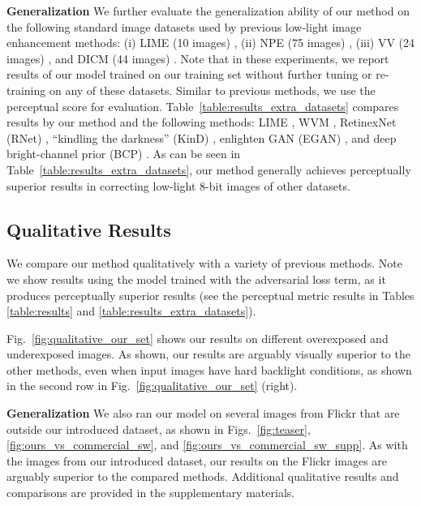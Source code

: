 \documentclass[final]{cvpr}
\begin{document}
\noindent\textbf{Generalization} We further evaluate the generalization ability of our method on the following standard image datasets used by previous low-light image enhancement methods: (i)  LIME (10 images) \cite{guo2017lime}, (ii)  NPE (75 images) \cite{wang2013naturalness}, (iii)  VV (24 images) \cite{VVDataset}, and  DICM (44 images) \cite{lee2012contrast}. Note that in these experiments, we report results of our model trained on our training set without further tuning or re-training on any of these datasets. Similar to previous methods, we use the  perceptual score \cite{mittal2012making} for evaluation. Table\ \ref{table:results_extra_datasets} compares results by our method and the following methods: LIME \cite{guo2016lime, guo2017lime}, WVM \cite{fu2016weighted}, RetinexNet (RNet) \cite{Chen2018Retinex}, ``kindling the darkness'' (KinD) \cite{zhang2019kindling}, enlighten GAN (EGAN) \cite{jiang2019enlightengan}, and deep bright-channel prior (BCP) \cite{8955834}. As can be seen in Table\ \ref{table:results_extra_datasets}, our method generally achieves perceptually superior results in correcting low-light 8-bit images of other datasets.













\subsection{Qualitative Results}\label{subsec:qual-results}

We compare our method qualitatively with a variety of previous methods. Note we show results using the model trained with the adversarial loss term, as it produces perceptually superior results (see the perceptual metric results in Tables \ref{table:results} and \ref{table:results_extra_datasets}).


Fig.~\ref{fig:qualitative_our_set} shows our results on different overexposed and underexposed images. As shown, our results are arguably visually superior to the other methods, even when input images have hard backlight conditions, as shown in the second row in Fig.~\ref{fig:qualitative_our_set} (right).

\noindent\textbf{Generalization} We also ran our model on several images from Flickr that are outside our introduced dataset, as shown in Figs.\ \ref{fig:teaser}, \ref{fig:ours_vs_commercial_sw}, and  \ref{fig:ours_vs_commercial_sw_supp}.  As with the images from our introduced dataset, our results on the Flickr images are arguably superior to the compared methods. Additional qualitative results and comparisons are provided in the supplementary materials.
\end{document}
